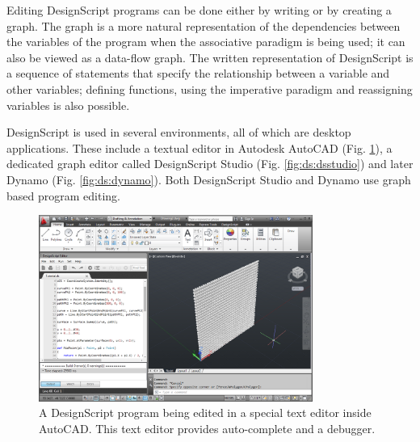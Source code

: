 Editing DesignScript programs can be done either by writing or by creating a graph.
The graph is a more natural representation of the dependencies between the variables of the program when the associative paradigm is being used; it can also be viewed as a data-flow graph.
The written representation of DesignScript is a sequence of statements that specify the relationship between a variable and other variables; defining functions, using the imperative paradigm and reassigning variables is also possible.

DesignScript is used in several environments, all of which are desktop applications.
These include a textual editor in Autodesk AutoCAD (Fig. \ref{fig:ds:autocad}), a dedicated graph editor called DesignScript Studio (Fig. \ref{fig:ds:dsstudio}) and later Dynamo (Fig. \ref{fig:ds:dynamo}).
Both DesignScript Studio and Dynamo use graph based program editing.

\begin{figure}
	\centering
	\includegraphics[width=0.8\textwidth]{images/ds_autocad}
	\caption{A DesignScript program being edited in a special text editor inside AutoCAD. This text editor provides auto-complete and a debugger.}
	\label{fig:ds:autocad}
\end{figure}

